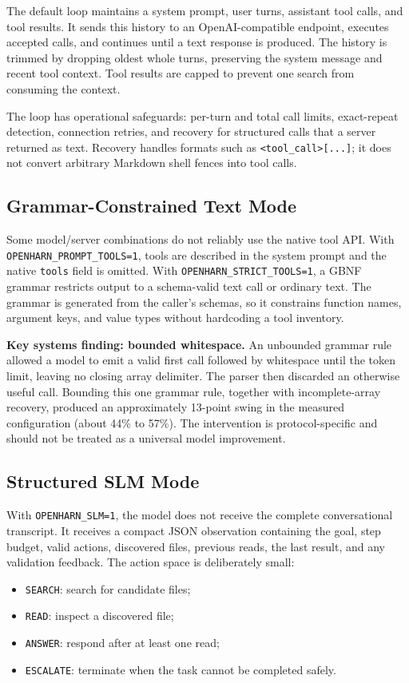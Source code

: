 \documentclass[conference]{IEEEtran}
\begin{document}
The default loop maintains a system prompt, user turns, assistant tool calls, and tool
results. It sends this history to an OpenAI-compatible endpoint, executes accepted calls, and
continues until a text response is produced. The history is trimmed by dropping oldest whole
turns, preserving the system message and recent tool context. Tool results are capped to
prevent one search from consuming the context.

The loop has operational safeguards: per-turn and total call limits, exact-repeat detection,
connection retries, and recovery for structured calls that a server returned as text. Recovery
handles formats such as \texttt{<tool\_call>[...]}; it does not convert arbitrary Markdown
shell fences into tool calls.

\subsection{Grammar-Constrained Text Mode}

Some model/server combinations do not reliably use the native tool API. With
\texttt{OPENHARN\_PROMPT\_TOOLS=1}, tools are described in the system prompt and the native
\texttt{tools} field is omitted. With \texttt{OPENHARN\_STRICT\_TOOLS=1}, a GBNF grammar
restricts output to a schema-valid text call or ordinary text. The grammar is generated from
the caller's schemas, so it constrains function names, argument keys, and value types without
hardcoding a tool inventory.

\textbf{Key systems finding: bounded whitespace.} An unbounded grammar rule allowed a model
to emit a valid first call followed by whitespace until the token limit, leaving no closing
array delimiter. The parser then discarded an otherwise useful call. Bounding this one grammar
rule, together with incomplete-array recovery, produced an approximately 13-point swing in the
measured configuration (about 44\% to 57\%). The intervention is protocol-specific and should
not be treated as a universal model improvement.

\subsection{Structured SLM Mode}

With \texttt{OPENHARN\_SLM=1}, the model does not receive the complete conversational
transcript. It receives a compact JSON observation containing the goal, step budget, valid
actions, discovered files, previous reads, the last result, and any validation feedback. The
action space is deliberately small:
\begin{itemize}
\item \texttt{SEARCH}: search for candidate files;
\item \texttt{READ}: inspect a discovered file;
\item \texttt{ANSWER}: respond after at least one read;
\item \texttt{ESCALATE}: terminate when the task cannot be completed safely.
\end{itemize}
\end{document}
